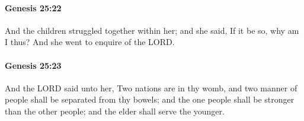 		\paragraph{Genesis 25:22} %
			\label{GENESIS-25-22}

			And the children struggled together within her; and she said, If it be so, why am I thus? And she went to enquire of the LORD.


		\paragraph{Genesis 25:23} %
			\label{GENESIS-25-23}

			And the LORD said unto her, Two nations are in thy womb, and two manner of people shall be separated from thy bowels; and the one people shall be stronger than the other people; and the elder shall serve the younger.


